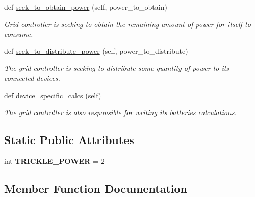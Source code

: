 \begin{DoxyCompactItemize}
def \hyperlink{class_build_1_1_objects_1_1grid__controller_1_1_grid_controller_ade27791e0e81bcb55583e7e711b9b5d0}{seek\+\_\+to\+\_\+obtain\+\_\+power} (self, power\+\_\+to\+\_\+obtain)
\begin{DoxyCompactList}\small\item\em Grid controller is seeking to obtain the remaining amount of power for itself to consume. \end{DoxyCompactList}\item 
def \hyperlink{class_build_1_1_objects_1_1grid__controller_1_1_grid_controller_ad85f2d1459669fe5be0d3c046c23a54b}{seek\+\_\+to\+\_\+distribute\+\_\+power} (self, power\+\_\+to\+\_\+distribute)
\begin{DoxyCompactList}\small\item\em The grid controller is seeking to distribute some quantity of power to its connected devices. \end{DoxyCompactList}\item 
def \hyperlink{class_build_1_1_objects_1_1grid__controller_1_1_grid_controller_ae5087a1b8b5278e6340b027a860353dd}{device\+\_\+specific\+\_\+calcs} (self)
\begin{DoxyCompactList}\small\item\em The grid controller is also responsible for writing its batteries calculations. \end{DoxyCompactList}\end{DoxyCompactItemize}
\subsection*{Static Public Attributes}
\begin{DoxyCompactItemize}
\item 
\mbox{\label{class_build_1_1_objects_1_1grid__controller_1_1_grid_controller_af614a04e6d4ec6c8724676c541621095}} 
int {\bfseries T\+R\+I\+C\+K\+L\+E\+\_\+\+P\+O\+W\+ER} = 2
\end{DoxyCompactItemize}


\subsection{Member Function Documentation}
\mbox{\label{class_build_1_1_objects_1_1grid__controller_1_1_grid_controller_aa099c2aaa311e87adde7bc663efc0779}} 
